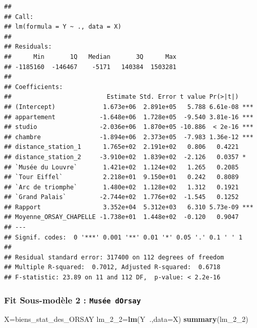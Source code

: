 \documentclass[french,]{article}
\newenvironment{Shaded}{\begin{snugshade}}{\end{snugshade}}
\newcommand{\DataTypeTok}[1]{\textcolor[rgb]{0.13,0.29,0.53}{#1}}
\newcommand{\DecValTok}[1]{\textcolor[rgb]{0.00,0.00,0.81}{#1}}
\newcommand{\KeywordTok}[1]{\textcolor[rgb]{0.13,0.29,0.53}{\textbf{#1}}}
\newcommand{\NormalTok}[1]{#1}
\newcommand{\OperatorTok}[1]{\textcolor[rgb]{0.81,0.36,0.00}{\textbf{#1}}}
\begin{document}
\begin{verbatim}
## 
## Call:
## lm(formula = Y ~ ., data = X)
## 
## Residuals:
##      Min       1Q   Median       3Q      Max 
## -1185160  -146467    -5171   140384  1503281 
## 
## Coefficients:
##                          Estimate Std. Error t value Pr(>|t|)    
## (Intercept)             1.673e+06  2.891e+05   5.788 6.61e-08 ***
## appartement            -1.648e+06  1.728e+05  -9.540 3.81e-16 ***
## studio                 -2.036e+06  1.870e+05 -10.886  < 2e-16 ***
## chambre                -1.894e+06  2.373e+05  -7.983 1.36e-12 ***
## distance_station_1      1.765e+02  2.191e+02   0.806   0.4221    
## distance_station_2     -3.910e+02  1.839e+02  -2.126   0.0357 *  
## `Musée du Louvre`       1.421e+02  1.124e+02   1.265   0.2085    
## `Tour Eiffel`           2.218e+01  9.150e+01   0.242   0.8089    
## `Arc de triomphe`       1.480e+02  1.128e+02   1.312   0.1921    
## `Grand Palais`         -2.744e+02  1.776e+02  -1.545   0.1252    
## Rapport                 3.352e+04  5.312e+03   6.310 5.73e-09 ***
## Moyenne_ORSAY_CHAPELLE -1.738e+01  1.448e+02  -0.120   0.9047    
## ---
## Signif. codes:  0 '***' 0.001 '**' 0.01 '*' 0.05 '.' 0.1 ' ' 1
## 
## Residual standard error: 317400 on 112 degrees of freedom
## Multiple R-squared:  0.7012, Adjusted R-squared:  0.6718 
## F-statistic: 23.89 on 11 and 112 DF,  p-value: < 2.2e-16
\end{verbatim}

\hypertarget{fit-sous-moduxe8le-2-musuxe9e-dorsay}{%
\subsubsection{\texorpdfstring{Fit Sous-modèle 2 :
\texttt{Musée\ d\textquotesingle{}Orsay}}{Fit Sous-modèle 2 : Musée d'Orsay}}\label{fit-sous-moduxe8le-2-musuxe9e-dorsay}}

\begin{Shaded}
\begin{Highlighting}[]
\NormalTok{X=biens_stat_des_ORSAY}
\NormalTok{lm_}\DecValTok{2}\NormalTok{_}\DecValTok{2}\NormalTok{=}\KeywordTok{lm}\NormalTok{(Y}\OperatorTok{~}\NormalTok{.,}\DataTypeTok{data=}\NormalTok{X)  }
\KeywordTok{summary}\NormalTok{(lm_}\DecValTok{2}\NormalTok{_}\DecValTok{2}\NormalTok{)}
\end{Highlighting}
\end{Shaded}
\end{document}
